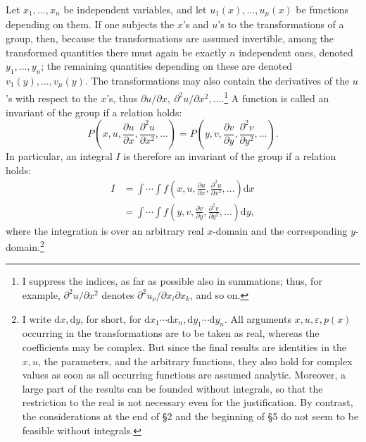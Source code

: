 \documentclass[11pt]{article}
\providecommand{\eps}{\varepsilon}
\providecommand{\dd}{\mathrm d}
\providecommand{\p}{\partial}
\providecommand{\p}{\partial}
\providecommand{\dd}{\mathrm d}
\begin{document}
Let \(x_1,\ldots,x_n\) be independent variables, and let \(u_1(x),\ldots,u_\mu(x)\) be functions depending on them. If one subjects the \(x\)'s and \(u\)'s to the transformations of a group, then, because the transformations are assumed invertible, among the transformed quantities there must again be exactly \(n\) independent ones, denoted \(y_1,\ldots,y_n\); the remaining quantities depending on these are denoted \(v_1(y),\ldots,v_\mu(y)\). The transformations may also contain the derivatives of the \(u\)'s with respect to the \(x\)'s, thus \(\p u/\p x,\ \p^2u/\p x^2,\ldots\).\footnote{I suppress the indices, as far as possible also in summations; thus, for example, \(\p^2u/\p x^2\) denotes \(\p^2u_\nu/\p x_i\p x_k\), and so on.} A function is called an invariant of the group if a relation holds:
\[
P\!\left(x,u,\frac{\p u}{\p x},\frac{\p^2u}{\p x^2},\ldots\right)
 =
P\!\left(y,v,\frac{\p v}{\p y},\frac{\p^2v}{\p y^2},\ldots\right).
\]
In particular, an integral \(I\) is therefore an invariant of the group if a relation holds:
\begin{equation}
\begin{aligned}
I&=\int\!\cdots\!\int f\!\left(x,u,\frac{\p u}{\p x},\frac{\p^2u}{\p x^2},\ldots\right)\dd x\\
 &=\int\!\cdots\!\int f\!\left(y,v,\frac{\p v}{\p y},\frac{\p^2v}{\p y^2},\ldots\right)\dd y,
\end{aligned}
\tag{1}
\end{equation}
where the integration is over an arbitrary real \(x\)-domain and the corresponding \(y\)-domain.\footnote{I write \(\dd x,\dd y\), for short, for \(\dd x_1\cdots \dd x_n,\dd y_1\cdots \dd y_n\). All arguments \(x,u,\eps,p(x)\) occurring in the transformations are to be taken as real, whereas the coefficients may be complex. But since the final results are identities in the \(x,u\), the parameters, and the arbitrary functions, they also hold for complex values as soon as all occurring functions are assumed analytic. Moreover, a large part of the results can be founded without integrals, so that the restriction to the real is not necessary even for the justification. By contrast, the considerations at the end of \S{}2 and the beginning of \S{}5 do not seem to be feasible without integrals.}
\end{document}
